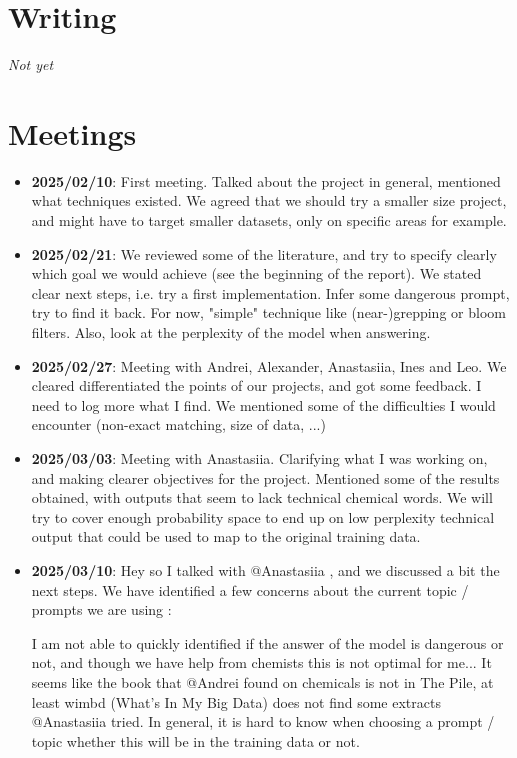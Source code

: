 \documentclass[a4paper,12pt]{article}
\begin{document}
\section*{Writing }
\textit{Not yet}

\section*{Meetings}
\begin{itemize}
    \item \textbf{2025/02/10}: First meeting. Talked about the project in general, mentioned what techniques existed. We agreed that we should try a smaller size project, and might have to target smaller datasets, only on specific areas for example.  
    \item \textbf{2025/02/21}: We reviewed some of the literature, and try to specify clearly which goal we would achieve (see the beginning of the report). We stated clear next steps, i.e. try a first implementation. Infer some dangerous prompt, try to find it back. For now, "simple" technique like (near-)grepping or bloom filters. Also, look at the perplexity of the model when answering.  
    \item \textbf{2025/02/27}: Meeting with Andrei, Alexander, Anastasiia, Ines and Leo. We cleared differentiated the points of our projects, and got some feedback. I need to log more what I find. We mentioned some of the difficulties I would encounter (non-exact matching, size of data, ...)
    \item \textbf{2025/03/03}: Meeting with Anastasiia. Clarifying what I was working on, and making clearer objectives for the project. Mentioned some of the results obtained, with outputs that seem to lack technical chemical words. We will try to cover enough probability space to end up on low perplexity technical output that could be used to map to the original training data.
    \item \textbf{2025/03/10}: Hey so I talked with @Anastasiia , and we discussed a bit the next steps.
We have identified a few concerns about the current topic / prompts we are using : 

    I am not able to quickly identified if the answer of the model is dangerous or not, and though we have help from chemists this is not optimal for me...
    It seems like the book that @Andrei found on chemicals is not in The Pile, at least wimbd (What's In My Big Data) does not find some extracts @Anastasiia tried.
    In general, it is hard to know when choosing a prompt / topic whether this will be in the training data or not.



\end{itemize}
\end{document}
